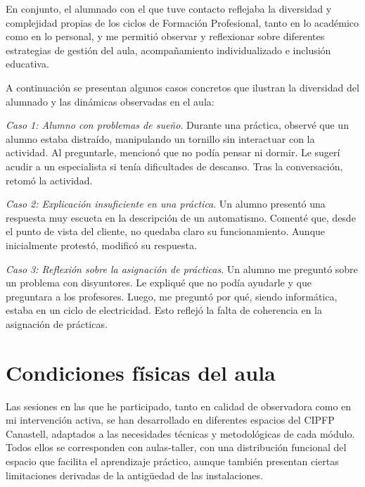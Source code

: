 En conjunto, el alumnado con el que tuve contacto reflejaba la diversidad y complejidad propias de los ciclos de Formación Profesional, tanto en lo académico como en lo personal, y me permitió observar y reflexionar sobre diferentes estrategias de gestión del aula, acompañamiento individualizado e inclusión educativa.

A continuación se presentan algunos casos concretos que ilustran la diversidad del alumnado y las dinámicas observadas en el aula:

\textit{Caso 1: Alumno con problemas de sueño}.  
Durante una práctica, observé que un alumno estaba distraído, manipulando un tornillo sin interactuar con la actividad. Al preguntarle, mencionó que no podía pensar ni dormir. Le sugerí acudir a un especialista si tenía dificultades de descanso. Tras la conversación, retomó la actividad.

\textit{Caso 2: Explicación insuficiente en una práctica}. 
Un alumno presentó una respuesta muy escueta en la descripción de un automatismo. Comenté que, desde el punto de vista del cliente, no quedaba claro su funcionamiento. Aunque inicialmente protestó, modificó su respuesta.

\textit{Caso 3: Reflexión sobre la asignación de prácticas}.  
Un alumno me preguntó sobre un problema con disyuntores. Le expliqué que no podía ayudarle y que preguntara a los profesores. Luego, me preguntó por qué, siendo informática, estaba en un ciclo de electricidad. Esto reflejó la falta de coherencia en la asignación de prácticas.



\section{Condiciones físicas del aula}

Las sesiones en las que he participado, tanto en calidad de observadora como en mi intervención activa, se han desarrollado en diferentes espacios del CIPFP Canastell, adaptados a las necesidades técnicas y metodológicas de cada módulo. Todos ellos se corresponden con aulas-taller, con una distribución funcional del espacio que facilita el aprendizaje práctico, aunque también presentan ciertas limitaciones derivadas de la antigüedad de las instalaciones.

